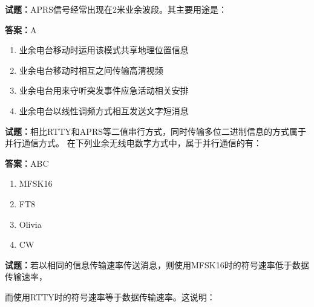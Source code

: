 \documentclass{ctexbook}
\begin{document}




\vspace{1em}

\textbf{试题：}APRS信号经常出现在2米业余波段。其主要用途是： 

\textbf{答案：}A 

\begin{enumerate}[leftmargin=3em]
  \item 业余电台移动时运用该模式共享地理位置信息 

  \item 业余电台移动时相互之间传输高清视频 

  \item 业余电台用来守听突发事件应急活动相关安排 

  \item 业余电台以线性调频方式相互发送文字短消息 

\end{enumerate}





\vspace{1em}

\textbf{试题：}相比RTTY和APRS等二值串行方式，同时传输多位二进制信息的方式属于并行通信方式。
在下列业余无线电数字方式中，属于并行通信的有： 

\textbf{答案：}ABC 

\begin{enumerate}[leftmargin=3em]
  \item MFSK16 

  \item FT8 

  \item Olivia 

  \item CW 

\end{enumerate}





\vspace{1em}

\textbf{试题：}若以相同的信息传输速率传送消息，则使用MFSK16时的符号速率低于数据传输速率，


而使用RTTY时的符号速率等于数据传输速率。这说明： 
\end{document}
